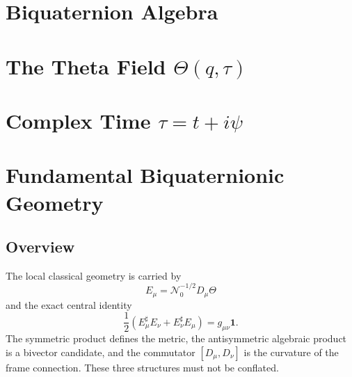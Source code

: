 \documentclass[12pt,a4paper]{article}
\begin{document}

\section{Biquaternion Algebra}
\label{sec:biquaternion_algebra}



\section{The Theta Field $\Theta(q,\tau)$}
\label{sec:theta_field}




\section{Complex Time $\tau = t + i\psi$}
\label{sec:biquaternion_time}




\section{Fundamental Biquaternionic Geometry}
\label{sec:biquaternion_geometry}

\subsection{Overview}

The local classical geometry is carried by
\[
 E_\mu=\mathcal N_0^{-1/2}D_\mu\Theta
\]
and the exact central identity
\[
 \frac12(E_\mu^\sharp E_\nu+E_\nu^\sharp E_\mu)
 =g_{\mu\nu}\mathbf1.
\]
The symmetric product defines the metric, the antisymmetric algebraic product
is a bivector candidate, and the commutator $[D_\mu,D_\nu]$ is the curvature of
the frame connection.  These three structures must not be conflated.
\end{document}
